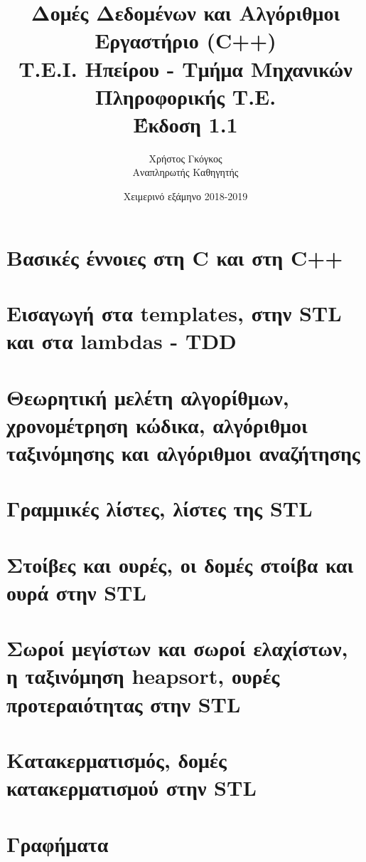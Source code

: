 \documentclass[11pt,a4paper]{book}
\title{Δομές Δεδομένων και Αλγόριθμοι \\ Εργαστήριο (C++)\\ Τ.Ε.Ι. Ηπείρου - Τμήμα Μηχανικών Πληροφορικής Τ.Ε. \\ Έκδοση 1.1}
\author{Χρήστος Γκόγκος  \\ Αναπληρωτής Καθηγητής }
\date{Χειμερινό εξάμηνο 2018-2019}
\begin{document}
\frontmatter
\maketitle
\tableofcontents
\mainmatter

\chapter{Βασικές έννοιες στη C και στη C++}


\chapter{Εισαγωγή στα templates, στην STL και στα lambdas - TDD}


\chapter{Θεωρητική μελέτη αλγορίθμων, χρονομέτρηση κώδικα, αλγόριθμοι ταξινόμησης και αλγόριθμοι αναζήτησης}


\chapter{Γραμμικές λίστες, λίστες της STL}


\chapter{Στοίβες και ουρές, οι δομές στοίβα και ουρά στην STL}


\chapter{Σωροί μεγίστων και σωροί ελαχίστων, η ταξινόμηση heapsort, ουρές προτεραιότητας στην STL}


\chapter{Κατακερματισμός, δομές κατακερματισμού στην STL}


\chapter{Γραφήματα}

\end{document}
